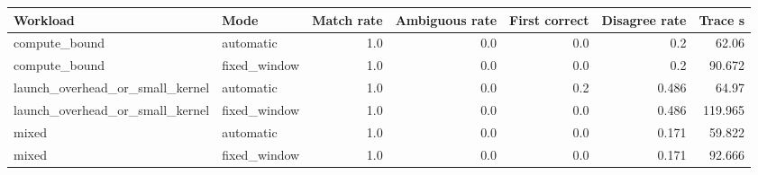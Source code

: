 \begin{tabular}{llrrrrr}
\hline
Workload & Mode & Match rate & Ambiguous rate & First correct & Disagree rate & Trace s \\
\hline
compute_bound & automatic & 1.0 & 0.0 & 0.0 & 0.2 & 62.06 \\
compute_bound & fixed_window & 1.0 & 0.0 & 0.0 & 0.2 & 90.672 \\
launch_overhead_or_small_kernel & automatic & 1.0 & 0.0 & 0.2 & 0.486 & 64.97 \\
launch_overhead_or_small_kernel & fixed_window & 1.0 & 0.0 & 0.0 & 0.486 & 119.965 \\
mixed & automatic & 1.0 & 0.0 & 0.0 & 0.171 & 59.822 \\
mixed & fixed_window & 1.0 & 0.0 & 0.0 & 0.171 & 92.666 \\
\hline
\end{tabular}
